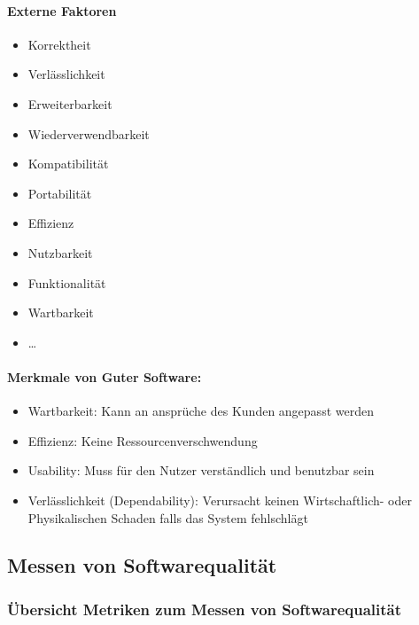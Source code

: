\documentclass[ngerman,color=3b]{tuda_summary}
\begin{document}
\paragraph{Externe Faktoren}
\begin{itemize}
    \item Korrektheit
    \item Verlässlichkeit
    \item Erweiterbarkeit
    \item Wiederverwendbarkeit
    \item Kompatibilität
    \item Portabilität
    \item Effizienz
    \item Nutzbarkeit
    \item Funktionalität
    \item Wartbarkeit
    \item \dots
\end{itemize}
\begin{defBox}
    \paragraph{Merkmale von Guter Software:}\begin{itemize}
        \item Wartbarkeit: Kann an ansprüche des Kunden angepasst werden
        \item Effizienz: Keine Ressourcenverschwendung
        \item Usability: Muss für den Nutzer verständlich und benutzbar sein
        \item Verlässlichkeit (Dependability): Verursacht keinen Wirtschaftlich- oder Physikalischen Schaden falls das System fehlschlägt
    \end{itemize}
\end{defBox}

\clearpage
\subsection{Messen von Softwarequalität}
\subsubsection{Übersicht Metriken zum Messen von Softwarequalität}
\label{sec:metrics}
\end{document}
